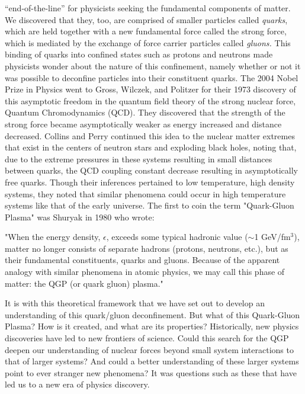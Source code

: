 ``end-of-the-line'' for physicists seeking the fundamental components of matter. We discovered that they, too, are comprised of smaller particles called \textit{quarks}, which are held together with a new fundamental force called the strong force, which is mediated by the exchange of force carrier particles called \textit{gluons.} This binding of quarks into confined states such as protons and neutrons made physicists wonder about the nature of this confinement, namely whether or not it was possible to deconfine particles into their constituent quarks. The 2004 Nobel Prize in Physics went to Gross, Wilczek\citep{PhysRevD.8.3633}, and Politzer\citep{PhysRevLett.30.1346} for their 1973 discovery of this asymptotic freedom in the quantum field theory of the strong nuclear force, Quantum Chromodynamics (QCD). They discovered that the strength of the strong force became asymptotically weaker as energy increased and distance decreased. Collins and Perry\citep{Collins:1974ky} continued this idea to the nuclear matter extremes that exist in the centers of neutron stars and exploding black holes, noting that, due to the extreme pressures in these systems resulting in small distances between quarks, the QCD coupling constant decrease resulting in asymptotically free quarks. Though their inferences pertained to low temperature, high density systems, they noted that similar phenomena could occur in high temperature systems like that of the early universe. The first to coin the term "Quark-Gluon Plasma" was Shuryak in 1980 \citep{Shuryak:1980tp} who wrote: 

\begin{addmargin}[1.5em]{2em}
"When the energy density, $\epsilon$, exceeds some typical hadronic value ($\sim$1 GeV/fm$^{3}$), matter no longer consists of separate hadrons (protons, neutrons, etc.), but as their fundamental constituents, quarks and gluons. Because of the apparent analogy with similar phenomena in atomic physics, we may call this phase of matter: the QGP (or quark gluon) plasma."
\end{addmargin}
 
It is with this theoretical framework that we have set out to develop an understanding of this quark/gluon deconfinement. But what of this Quark-Gluon Plasma? How is it created, and what are its properties? Historically, new physics discoveries have led to new frontiers of science. Could this search for the QGP deepen our understanding of nuclear forces beyond small system interactions to that of larger systems? And could a better understanding of these larger systems point to ever stranger new phenomena? It was questions such as these that have led us to a new era of physics discovery.

